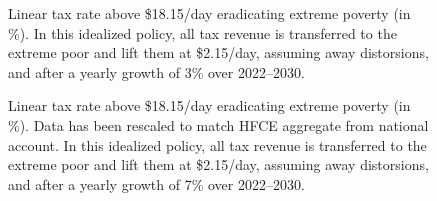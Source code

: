 \begin{figure}[!htb]
  \caption[Anti-extreme-poverty tax above \$18.15/day after 3\% growth.]{Linear tax rate above \$18.15/day eradicating extreme poverty (in \%). In this idealized policy, all tax revenue is transferred to the extreme poor and lift them at \$2.15/day, assuming away distorsions, and after a yearly growth of 3\% over 2022--2030. 
  }\label{fig:antipoverty_2_tax_18_average}
\end{figure}

\begin{figure}[!htb]
  \caption[Anti-extreme-poverty tax above \$18.15/day after 7\% growth (HFCE-scaled).]{Linear tax rate above \$18.15/day eradicating extreme poverty (in \%). Data has been rescaled to match HFCE aggregate from national account. In this idealized policy, all tax revenue is transferred to the extreme poor and lift them at \$2.15/day, assuming away distorsions, and after a yearly growth of 7\% over 2022--2030. 
  }\label{fig:s_antipoverty_2_tax_18_very_optimistic}
\end{figure}

